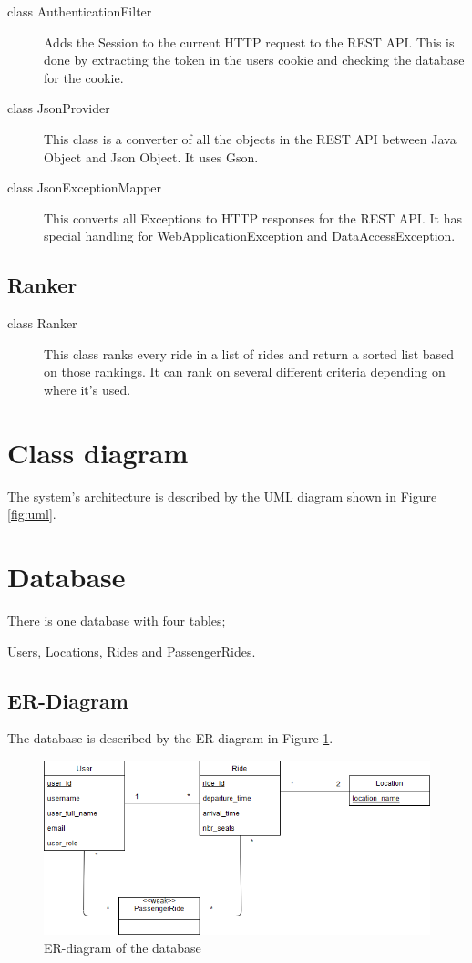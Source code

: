 \documentclass{article}
\begin{document}
\begin{description}
    \item[class AuthenticationFilter] Adds the Session to the current HTTP request to the REST API. This is done by extracting the token in the users cookie and checking the database for the cookie.
    \item[class JsonProvider] This class is a converter of all the objects in the REST API between Java Object and Json Object. It uses Gson.
    \item[class JsonExceptionMapper] This converts all Exceptions to HTTP responses for the REST API. It has special handling for WebApplicationException and DataAccessException.
\end{description}

\subsection{Ranker}

\begin{description}
    \item[class Ranker] This class ranks every ride in a list of rides and return a sorted list based on those rankings. It can rank on several different criteria depending on where it's used.
\end{description}

\section{Class diagram}
The system's architecture is described by the UML diagram shown in Figure \ref{fig:uml}.

\section{Database}
    There is one database with four tables;
    
    Users, Locations, Rides and PassengerRides.
\subsection{ER-Diagram}
The database is described by the ER-diagram in Figure \ref{fig:er}.
\begin{figure}[h]
  \centering
  \includegraphics[scale=0.52]{ERDiagram.png}
  \caption{ER-diagram of the database}
  \label{fig:er}
\end{figure}
\end{document}
